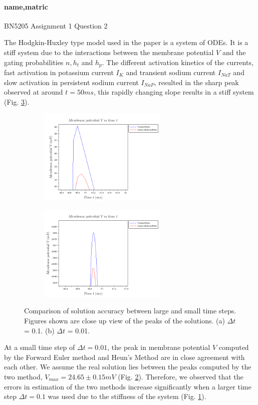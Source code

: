 \documentclass{article}
\begin{document}
  \paragraph{name,matric} BN5205 Assignment 1 Question 2
  
  The Hodgkin-Huxley type model used in the paper is a system of ODEs. It is a 
  stiff system due to the interactions between the membrane potential $V$ and 
  the gating probabilities $n, h_t$ and $h_p$. The different activation 
  kinetics of the currents, fast activation in potassium current $I_K$ and 
  transient sodium current $I_{NaT}$ and slow activation in persistent sodium 
  current $I_{NaP}$, resulted in the sharp peak observed at around $t = 50 ms$, 
  this rapidly changing slope results in a stiff system (Fig. \ref{fig:peak}).
  \begin{figure}[h]
    \begin{subfigure}{.5\textwidth}
    \centering
    \includegraphics[width=230px]{img/large-tstep}
    \caption{ \label{fig:large-tstep}}
    \end{subfigure}
    \begin{subfigure}{.5\textwidth}
    \includegraphics[width=230px]{img/small-tstep}
    \caption{ \label{fig:small-step}}
    \end{subfigure}
    \caption{\small Comparison of solution accuracy between large and small 
    time steps. Figures shown are close up view of the peaks of the solutions. 
    (a) $\Delta t$ = 0.1. (b) $\Delta t$ = 0.01. \label{fig:peak}}
  \end{figure}
  
  At a small time step of $\Delta t = 0.01$, the peak in membrane potential $V$ 
  computed by the Forward Euler method and Heun's Method are in close agreement 
  with each other. We assume the real solution lies between the peaks computed 
  by the two method, $V_{max} = 24.65 \pm 0.15 mV$ (Fig. \ref{fig:small-step}). 
  Therefore, we observed that the errors in estimation of the two methods 
  increase significantly when a larger time step $\Delta t = 0.1$ was used due 
  to the stiffness of the system (Fig. \ref{fig:large-tstep}).
\end{document}
